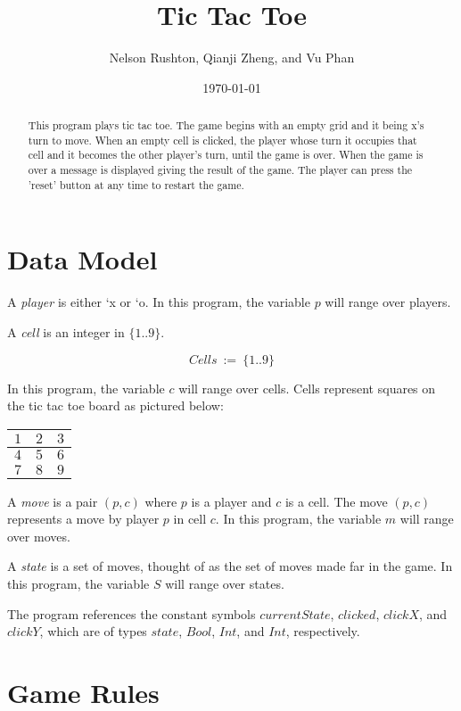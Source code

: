 \documentclass[a4paper]{article}
\title{Tic Tac Toe}
\author{Nelson Rushton, Qianji Zheng, and Vu Phan}
\date{\today}
\newcommand{\defun}[2] {$$ #1\ :=\ #2$$}
\begin{document}
\maketitle

\begin{abstract}
This program plays tic tac toe. The game begins with an empty grid and it being x's turn to move. When an empty cell is clicked, the player whose turn it occupies that cell and it becomes the other player's turn, until the game is over. When the game is over a message is displayed giving the result of the  game. The player can press the 'reset' button at any time to restart the game.

\end{abstract}

\section{Data Model}

A {\it player} is either `x or `o. In this program, the variable $p$ will range over players.

\bigskip\noindent
A {\it cell} is an integer in $\{1..9\}$. 

\defun{Cells}{\{1..9\}}

\noindent
In this program, the variable $c$ will range over cells. Cells represent squares on the tic tac toe board as pictured below:
\bigskip\bigskip


\begin{tabular}{c|c|c}
$1$  &  $2$    &   $3$  \\
\hline
$4$ &  $5$    &   $6$  \\
\hline
$7$ &  $8$    &   $9$  
\end{tabular}

\bigskip\noindent
A {\it move} is a pair $(p,c)$ where $p$ is a player and $c$ is a cell. The move $(p,c)$ represents a move by player $p$ in cell $c$. In this program, the variable $m$ will range over moves.

\bigskip\noindent
A {\it state} is a set of moves, thought of as the set of moves made far in the game. In this program, the variable $S$ will range over states.

\bigskip\noindent
The program references the constant symbols $currentState$, $clicked$, $clickX$, and $clickY$, which are of types $state$, $Bool$, $Int$, and $Int$, respectively. 

\pagebreak

\section{Game Rules}
\label{sec:theory}
\end{document}
